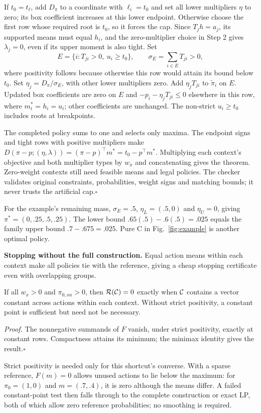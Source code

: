 If $t_0=t_\ell$, add $D_\pi$ to a coordinate with $\ell_i=t_0$ and set all
lower multipliers $\eta$ to zero; its box coefficient increases at this lower endpoint.
Otherwise choose the first row whose required root is $t_0$, so it forces the cap.
Since $T_jh=a_j$, its supported means must equal $h_i$, and the zero-multiplier
choice in Step 2 gives $\lambda_j=0$, even if its upper moment is also tight. Set
\[
 E=\{i:T_{ji}>0,\ u_i\ge t_0\},\qquad
 \sigma_E=\sum_{i\in E}T_{ji}>0,
\]
where positivity follows because otherwise this row would attain its bound
below $t_0$. Set $\eta_j=D_\pi/\sigma_E$, with other lower multipliers zero.
Add $\eta_jT_{ji}$ to
$\widetilde\pi_i$ on $E$. Updated box coefficients are zero on $E$ and
$-p_i-\eta_jT_{ji}\le0$ elsewhere in this row, where $m_i^*=h_i=u_i$;
other coefficients are unchanged. The non-strict $u_i\ge t_0$ includes
roots at breakpoints.

The completed policy sums to one and selects only maxima. The endpoint signs and tight rows with positive multipliers make $D(\pi-p;(\eta,\lambda))=(\pi-p)^\top m^*=t_0-p^\top m^*$. Multiplying each context's objective and both multiplier types by $w_x$ and concatenating gives the theorem. Zero-weight contexts still need feasible means and legal policies. The checker validates original constraints, probabilities, weight signs and matching bounds; it never trusts the artificial cap.\hfill$\square$

For the example's remaining mass, $\sigma_E=.5$, $\eta_L=(.5,0)$ and $\eta_U=0$, giving $\pi^*=(0,.25,.5,.25)$.
The lower bound $.65(.5)-.6(.5)=.025$ equals the family upper bound
$.7-.675=.025$. Pure C in Fig.~\ref{fig:example} is another optimal policy.

\textbf{Stopping without the full construction.}
Equal action means within each context make all policies tie with the reference, giving a cheap stopping certificate even with overlapping groups.
\begin{proposition}\label{prop:zero-capacity}
If all $w_x>0$ and $\pi_{0,xa}>0$, then $\mathcal R(\mathcal{C})=0$ exactly when $\mathcal{C}$ contains a vector constant across actions within each context. Without strict positivity, a constant point is sufficient but need not be necessary.
\end{proposition}
\noindent\textit{Proof.} The nonnegative summands of $F$ vanish, under strict positivity, exactly at constant rows. Compactness attains its minimum; the minimax identity gives the result.\hfill$\square$

Strict positivity is needed only for this shortcut's converse. With a sparse reference, $F(m)=0$ allows unused actions to lie below the maximum: for $\pi_0=(1,0)$ and $m=(.7,.4)$, it is zero although the means differ. A failed constant-point test then falls through to the complete construction or exact LP, both of which allow zero reference probabilities; no smoothing is required.

